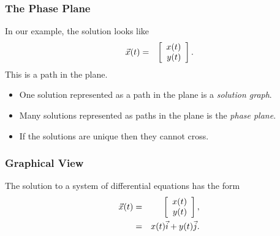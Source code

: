 \begin{frame}
  \frametitle{The Phase Plane}

  In our example, the solution looks like
  \begin{eqnarray*}
    \vec{x}(t) & = & \left[ \begin{array}{r} x(t) \\ y(t) \end{array} \right].
  \end{eqnarray*}
  This is a path in the plane.

  \begin{itemize}
  \item One solution represented as a path in the plane is a \textit{solution graph}.
  \item Many solutions represented as paths in the plane is the \textit{phase plane}.
  \item If the solutions are unique then they cannot cross.
  \end{itemize}

\end{frame}

\begin{frame}
    \frametitle{Graphical View}

  The solution to a system of differential equations has the form
  \begin{eqnarray*}
    \vec{x}(t) & = & \left[ \begin{array}{r} x(t) \\ y(t) \end{array} \right], \\
    & = & x(t) \vec{i} + y(t)\vec{j}.
  \end{eqnarray*}


  

\end{frame}

